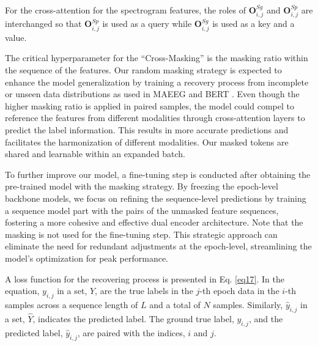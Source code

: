 

For the cross-attention for the spectrogram features, the roles of $\textbf{O}^{Sg}_{i, j}$ and $\textbf{O}^{Sp}_{i, j}$ are interchanged so that $\textbf{O}^{Sp}_{i, j}$ is used as a query while $\textbf{O}^{Sg}_{i, j}$ is used as a key and a value.

The critical hyperparameter for the ``Cross-Masking'' is the masking ratio within the sequence of the features. Our random masking strategy is expected to enhance the model generalization by training a recovery process from incomplete or unseen data distributions as used in MAEEG \cite{chien2022maeeg} and BERT \cite{devlin2019bert}.
%
Even though the higher masking ratio is applied in paired samples, the model could compel to reference the features from different modalities %
through cross-attention layers to predict the label information. This results in more accurate predictions and facilitates the harmonization of different modalities.
%
Our masked tokens are shared and learnable within an expanded batch.






To further improve our model, a fine-tuning step is conducted after obtaining the pre-trained model with the masking strategy. By freezing the epoch-level backbone models, we focus on refining the sequence-level predictions by training a sequence model part with the pairs of the unmasked feature sequences, fostering a more cohesive and effective dual encoder architecture. 
Note that the masking is not used for the fine-tuning step. 
%
This strategic approach can eliminate the need for redundant adjustments at the epoch-level, streamlining the model's optimization for peak performance. %

A loss function for the recovering process is presented in Eq. \ref{eq17}. In the equation, $y_{i, j}$ in a set, $Y$, are the true labels in the $j$-th epoch data in the $i$-th samples across a sequence length of $L$ and a total of $N$ samples.
%
Similarly, $\hat{y}_{i, j}$ in a set, $\hat{Y}$, indicates the predicted label. The ground true label, $y_{i, j}$, and the predicted label, $\hat{y}_{i, j}$, are paired with the indices, $i$ and $j$.

